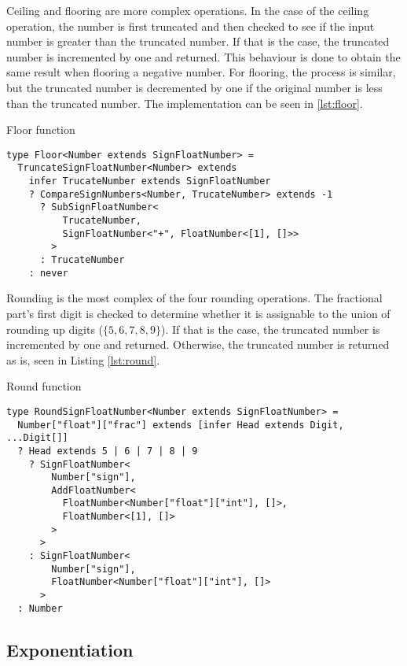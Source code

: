 Ceiling and flooring are more complex operations. In the case of the ceiling operation, the number is first truncated and then checked to see if the input number is greater than the truncated number. If that is the case, the truncated number is incremented by one and returned. This behaviour is done to obtain the same result when flooring a negative number. For flooring, the process is similar, but the truncated number is decremented by one if the original number is less than the truncated number. The implementation can be seen in \ref{lst:floor}.

\begin{listing}[ht]
  \caption{Floor function}\label{lst:floor}
  \begin{verbatim}
type Floor<Number extends SignFloatNumber> =
  TruncateSignFloatNumber<Number> extends 
    infer TrucateNumber extends SignFloatNumber
    ? CompareSignNumbers<Number, TrucateNumber> extends -1
      ? SubSignFloatNumber<
          TrucateNumber,
          SignFloatNumber<"+", FloatNumber<[1], []>>
        >
      : TrucateNumber
    : never
\end{verbatim}
\end{listing}

Rounding is the most complex of the four rounding operations. The fractional part's first digit is checked to determine whether it is assignable to the union of rounding up digits ($\{ 5,6,7,8,9 \}$). If that is the case, the truncated number is incremented by one and returned. Otherwise, the truncated number is returned as is, seen in Listing \ref{lst:round}.

\begin{listing}[ht]
  \caption{Round function}\label{lst:round}
  \begin{verbatim}
type RoundSignFloatNumber<Number extends SignFloatNumber> =
  Number["float"]["frac"] extends [infer Head extends Digit, ...Digit[]]
  ? Head extends 5 | 6 | 7 | 8 | 9
    ? SignFloatNumber<
        Number["sign"],
        AddFloatNumber<
          FloatNumber<Number["float"]["int"], []>,
          FloatNumber<[1], []>
        >
      >
    : SignFloatNumber<
        Number["sign"], 
        FloatNumber<Number["float"]["int"], []>
      >
  : Number
\end{verbatim}
\end{listing}

\subsection{Exponentiation}

